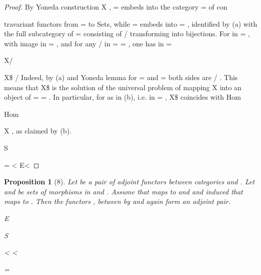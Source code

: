 \documentclass[11pt,a4paper]{article}
\theoremstyle{plain}
\newtheorem{proposition}[theorem]{Proposition}
\theoremstyle{definition}
\begin{document}
\begin{proof} By Yoneda construction  
X , = embeds into the category = of con


 
travariant functors from = to Sets, while =  embeds into =  , identified
by (a) with the full subcategory of =  consisting of / transforming  into bijections. For  in = , with image  in =  , and for any / in =    =  , one
has in = 


 X/


 X\$  / 
Indeed, by (a) and Yoneda lemma for = and =   both sides are / . This
means that X\$ is the solution of the universal problem of mapping X into an object
of =    =  . In particular, for  as in (b), i.e. in =   , X\$ coincides with
Hom

Hom



X , as claimed by (b).

  S

=
 <
E< 

\end{proof}

\begin{proposition}[8]
Let
be a pair of adjoint functors between categories and
. Let and be sets of morphisms in and . Assume that maps to and
 and
 induced
that maps to . Then the functors  ,  between
by and again form an adjoint pair.

E



S

<
< 

=

\end{proposition}
\end{document}
